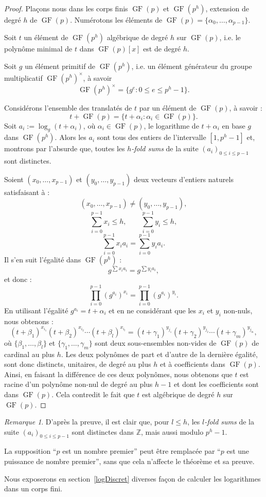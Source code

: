 \documentclass[a4paper, titlepage]{article}
\theoremstyle{definition}
\theoremstyle{remark}
\newtheorem{rema}[theo]{Remarque}
\def\Z{\mathbb Z}
\def\gf{\operatorname{GF}}
\begin{document}
\begin{proof}
Plaçons nous dans les corps finis $\gf(p)$ et $\gf(p^h)$, extension de degré $h$ de $\gf(p)$. Numérotons les éléments de $\gf(p) = \{\alpha_0, \dots, \alpha_{p-1} \}$. 

Soit $t$ un élément de $\gf(p^h)$ algébrique de degré $h$ sur $\gf(p)$, i.e. le polynôme minimal de $t$ dans $\gf(p)[x]$  est de degré $h$. 

Soit $g$ un élément primitif de $\gf(p^h)$, i.e. un élément générateur du groupe multiplicatif $\gf(p^h)^\times$, à savoir 
$$\gf(p^h)^\times = \{ g^e : 0 \leqslant e \leqslant p^h-1 \}.$$

Considérons l'ensemble des translatés de $t$ par un élément de $\gf(p)$, à savoir :
$$t + \gf(p) = \{ t + \alpha_i : \alpha_i \in \gf(p) \}.$$
Soit $a_i := \log_g(t + \alpha_i)$, où $\alpha_i \in \gf(p)$, le logarithme de $t+\alpha_i$ en base $g$ dans $\gf(p^h)$. Alors les $a_i$ sont tous des entiers de l'intervalle $[1, p^h -1]$ et, montrons par l'absurde que, toutes les \textit{$h$-fold sums} de la suite ${(a_i)}_{0\leqslant i \leqslant p-1}$ sont distinctes. 

Soient $(x_0, \dots, x_{p-1})$ et $(y_0, \dots, y_{p-1})$ deux vecteurs d'entiers naturels satisfaisant à :
$$(x_0, \dots, x_{p-1}) \neq (y_0, \dots, y_{p-1}),$$
$$\sum_{i=0}^{p-1}x_i \leqslant h, \qquad \sum_{i=0}^{p-1}y_i \leqslant h,$$
$$\sum_{i=0}^{p-1}x_ia_i = \sum_{i=0}^{p-1}y_ia_i.$$
Il s'en suit l'égalité dans $\gf(p^h)$ :
$$g^{\sum x_ia_i} = g^{\sum y_ia_i},$$
et donc :
$$\prod_{i=0}^{p-1} {\left({g^{a_i}}\right)}^{x_i} = \prod_{i=0}^{p-1} {\left({g^{a_i}}\right)}^{y_i}.$$
En utilisant l'égalité $g^{a_i} = t + \alpha_i$ et en ne considérant que les $x_i$ et $y_i$ non-nuls, nous obtenons :
$$(t+\beta_1)^{x_{i_1}}(t+\beta_2)^{x_{i_2}} \cdots (t+\beta_l)^{x_{i_l}} = (t+\gamma_1)^{y_{j_1}}(t+\gamma_2)^{y_{j_2}} \cdots (t+\gamma_m)^{y_{j_m}},$$
où $\{\beta_1, \dots, \beta_l \}$ et $\{ \gamma_1, \dots, \gamma_m\}$ sont deux sous-ensembles non-vides de $\gf(p)$ de cardinal au plus $h$. Les deux polynômes de part et d'autre de la dernière égalité, sont donc distincts, unitaires, de degré au plus $h$ et à coefficients dans $\gf(p)$. Ainsi, en faisant la différence de ces deux polynômes, nous obtenons que $t$ est racine d'un polynôme non-nul de degré au plus $h-1$ et dont les coefficients sont dans $\gf(p)$. Cela contredit le fait que $t$ est algébrique de degré $h$ sur $\gf(p)$.
\end{proof}

\begin{rema}
D'après la preuve, il est clair que, pour $l\leqslant h$, les \textit{$l$-fold sums} de la suite ${(a_i)}_{0\leqslant i \leqslant p-1}$ sont distinctes dans $\Z$, mais aussi modulo $p^h-1$.

La supposition ``$p$ est un nombre premier'' peut être remplacée par ``$p$ est une puissance de nombre premier'', sans que cela n'affecte le théorème et sa preuve.

Nous exposerons en section~\ref{logDiscret} diverses façon de calculer les logarithmes dans un corps fini.
\end{rema}
\end{document}
